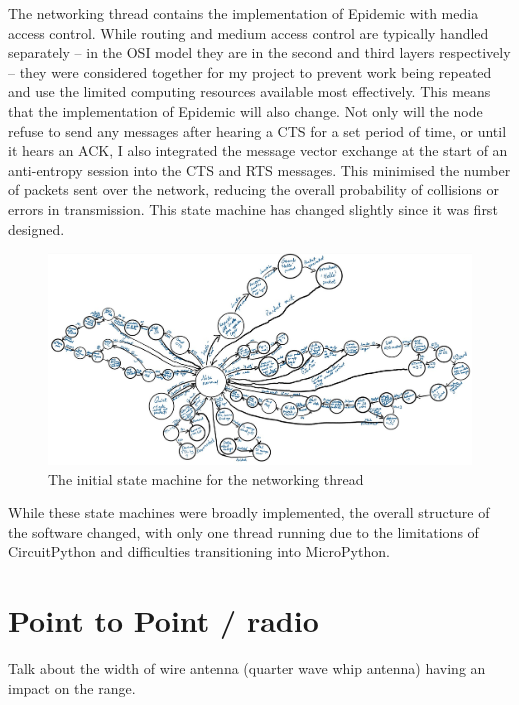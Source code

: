 \documentclass[12pt,a4paper]{report}
\begin{document}
\FloatBarrier
The networking thread contains the implementation of Epidemic with media access control. While routing and medium access control are typically handled separately -- in the OSI model they are in the second and third layers respectively -- they were considered together for my project to prevent work being repeated and use the limited computing resources available most effectively. This means that the implementation of Epidemic will also change. Not only will the node refuse to send any messages after hearing a CTS for a set period of time, or until it hears an ACK, I also integrated the message vector exchange at the start of an anti-entropy session into the CTS and RTS messages. This minimised the number of packets sent over the network, reducing the overall probability of collisions or errors in transmission. This state machine has changed slightly since it was first designed. 
\begin{figure}[h]
\begin{center}
\caption{The initial state machine for the networking thread}
\includegraphics[scale=0.5]{net.jpg}
\end{center}
\end{figure}
\FloatBarrier
While these state machines were broadly implemented, the overall structure of the software changed, with only one thread running due to the limitations of CircuitPython and difficulties transitioning into MicroPython.



\section{Point to Point / radio}
Talk about the width of wire antenna (quarter wave whip antenna) having an impact on the range. 
\end{document}
